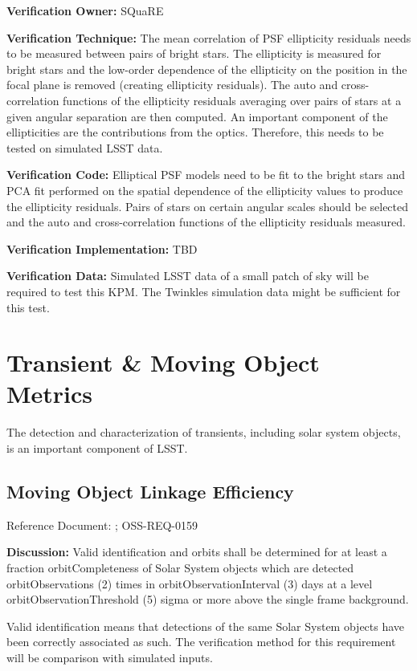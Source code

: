\documentclass[DM,lsstdraft,toc]{lsstdoc}
\begin{document}
\textbf{Verification Owner:} SQuaRE

\textbf{Verification Technique:} The mean correlation of PSF ellipticity
residuals needs to be measured between pairs of bright stars. The
ellipticity is measured for bright stars and the low-order dependence of
the ellipticity on the position in the focal plane is removed (creating
ellipticity residuals). The auto and cross-correlation functions of the
ellipticity residuals averaging over pairs of stars at a given angular
separation are then computed. An important component of the
ellipticities are the contributions from the optics. Therefore, this
needs to be tested on simulated LSST data.

\textbf{Verification Code:} Elliptical PSF models need to be fit to the
bright stars and PCA fit performed on the spatial dependence of the
ellipticity values to produce the ellipticity residuals. Pairs of stars
on certain angular scales should be selected and the auto and
cross-correlation functions of the ellipticity residuals measured.

\textbf{Verification Implementation:} TBD

\textbf{Verification Data:} Simulated LSST data of a small patch of sky
will be required to test this KPM. The Twinkles simulation data might be
sufficient for this test.

\section{Transient \& Moving Object
Metrics}\label{transient-moving-object-metrics}

The detection and characterization of transients, including solar system
objects, is an important component of LSST.

\subsection{Moving Object Linkage
Efficiency}\label{moving-object-linkage-efficiency}

Reference Document: ; OSS-REQ-0159

\textbf{Discussion:} Valid identification and orbits shall be determined
for at least a fraction orbitCompleteness of Solar System objects which
are detected orbitObservations (2) times in orbitObservationInterval (3)
days at a level orbitObservationThreshold (5) sigma or more above the
single frame background.

Valid identification means that detections of the same Solar System
objects have been correctly associated as such. The verification method
for this requirement will be comparison with simulated inputs.
\end{document}
